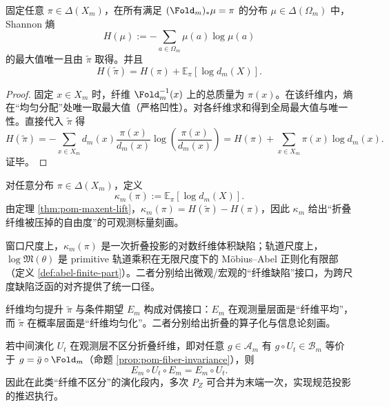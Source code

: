\begin{theorem}[最大熵提升的唯一性]\label{thm:pom-maxent-lift}
固定任意 $\pi\in\Delta(X_m)$，在所有满足 $(\Fold_m)_*\mu=\pi$ 的分布 $\mu\in\Delta(\Omega_m)$ 中，Shannon 熵
\[
H(\mu):=-\sum_{a\in\Omega_m}\mu(a)\log\mu(a)
\]
的最大值唯一且由 $\widetilde\pi$ 取得。并且
\[
H(\widetilde\pi)=H(\pi)+\mathbb{E}_{\pi}[\log d_m(X)].
\]
\end{theorem}
\begin{proof}
固定 $x\in X_m$ 时，纤维 $\Fold_m^{-1}(x)$ 上的总质量为 $\pi(x)$。在该纤维内，熵在“均匀分配”处唯一取最大值（严格凹性）。对各纤维求和得到全局最大值与唯一性。直接代入 $\widetilde\pi$ 得
\[
H(\widetilde\pi)
=-\sum_{x\in X_m}d_m(x)\frac{\pi(x)}{d_m(x)}\log\!\left(\frac{\pi(x)}{d_m(x)}\right)
=H(\pi)+\sum_{x\in X_m}\pi(x)\log d_m(x).
\]
证毕。
\end{proof}

\begin{definition}[热力学缺陷与空间投影标量]\label{def:pom-kappa}
对任意分布 $\pi\in\Delta(X_m)$，定义
\[
\kappa_m(\pi):=\mathbb{E}_{\pi}[\log d_m(X)].
\]
由定理 \ref{thm:pom-maxent-lift}，$\kappa_m(\pi)=H(\widetilde\pi)-H(\pi)$，因此 $\kappa_m$ 给出“折叠纤维被压掉的自由度”的可观测标量刻画。
\end{definition}

\begin{remark}[窗口缺陷与有限部常数的同型]\label{rem:pom-kappa-logm}
窗口尺度上，$\kappa_m(\pi)$ 是一次折叠投影的对数纤维体积缺陷；轨道尺度上，$\log\mathfrak{M}(\theta)$ 是 primitive 轨道乘积在无限尺度下的 Möbius--Abel 正则化有限部（定义 \ref{def:abel-finite-part}）。二者分别给出微观/宏观的“纤维缺陷”接口，为跨尺度缺陷泛函的对齐提供了统一口径。
\end{remark}

\begin{remark}[与条件期望的对偶性]
纤维均匀提升 $\widetilde\pi$ 与条件期望 $E_m$ 构成对偶接口：$E_m$ 在观测量层面是“纤维平均”，而 $\widetilde\pi$ 在概率层面是“纤维均匀化”。二者分别给出折叠的算子化与信息论刻画。
\end{remark}

\begin{remark}[延迟归一化推迟律]\label{rem:pom-lazy-fold}
若中间演化 $U_t$ 在观测层不区分折叠纤维，即对任意 $g\in\mathcal{A}_m$ 有 $g\circ U_t\in\mathcal{B}_m$ 等价于 $g=\bar g\circ\Fold_m$（命题 \ref{prop:pom-fiber-invariance}），则
\[
E_m\circ U_t\circ E_m=E_m\circ U_t.
\]
因此在此类“纤维不区分”的演化段内，多次 $P_Z$ 可合并为末端一次，实现规范投影的推迟执行。
\end{remark}

